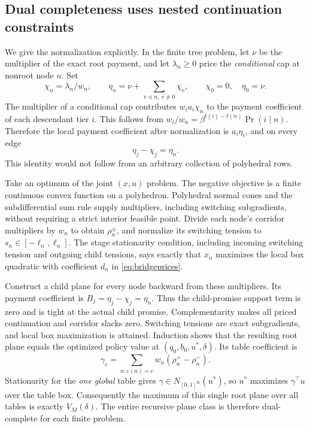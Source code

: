\subsection{Dual completeness uses nested continuation constraints}
We give the normalization explicitly. In the finite tree problem, let $\nu$ be the multiplier of the exact root payment, and let $\lambda_n\geq0$ price the \emph{conditional} cap at nonroot node $n$. Set
\[
 \chi_n=\lambda_n/w_n,\qquad
 \eta_n=\nu+\sum_{v\preceq n,\ v\ne0}\chi_v,
 \qquad \chi_0=0,\quad\eta_0=\nu.
\]
The multiplier of a conditional cap contributes $w_i a_i\chi_n$ to the payment coefficient of each descendant tier $i$. This follows from $w_i/w_n=\beta^{t(i)-t(n)}\Pr(i\mid n)$. Therefore the local payment coefficient after normalization is $a_i\eta_i$, and on every edge
\begin{equation}\label{eq:normalizedprices}
 \eta_j-\chi_j=\eta_n.
\end{equation}
This identity would not follow from an arbitrary collection of polyhedral rows.

Take an optimum of the joint $(x,u)$ problem. The negative objective is a finite continuous convex function on a polyhedron. Polyhedral normal cones and the subdifferential sum rule supply multipliers, including switching subgradients, without requiring a strict interior feasible point. Divide each node's corridor multipliers by $w_n$ to obtain $\rho_n^\pm$, and normalize its switching tension to $s_n\in[-\ell_n,\ell_n]$. The stage stationarity condition, including incoming switching tension and outgoing child tensions, says exactly that $x_n$ maximizes the local box quadratic with coefficient $d_n$ in \eqref{eq:bridgeprices}.

Construct a child plane for every node backward from these multipliers. Its payment coefficient is $B_j=\eta_j-\chi_j=\eta_n$. Thus the child-promise support term is zero and is tight at the actual child promise. Complementarity makes all priced continuation and corridor slacks zero. Switching tensions are exact subgradients, and local box maximization is attained. Induction shows that the resulting root plane equals the optimized policy value at $(q_0,b_0,u^*,\delta)$. Its table coefficient is
\[
 \gamma_c=\sum_{n:c(n)=c}w_n(\rho_n^+-\rho_n^-).
\]
Stationarity for the \emph{one global} table gives $\gamma\in N_{[0,1]^K}(u^*)$, so $u^*$ maximizes $\gamma^\top u$ over the table box. Consequently the maximum of this single root plane over all tables is exactly $V_M(\delta)$. The entire recursive plane class is therefore dual-complete for each finite problem.

